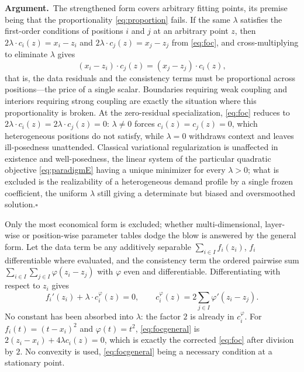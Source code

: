 \documentclass[twoside,11pt]{article}
\newcommand{\argument}{\par\medskip\noindent\textbf{Argument.}\ }
\newcommand{\qedbox}{\hfill$\square$}
\begin{document}
\argument The strengthened form covers arbitrary fitting points, its premise being that the proportionality \eqref{eq:proportion} fails. If the same $\lambda$ satisfies the first-order conditions of positions $i$ and $j$ at an arbitrary point $z$, then $2\lambda \cdot c_i (z) = x_i - z_i$ and $2\lambda \cdot c_j (z) = x_j - z_j$ from \eqref{eq:foc}, and cross-multiplying to eliminate $\lambda$ gives
\begin{equation}
(x_i - z_i) \cdot c_j (z) = (x_j - z_j) \cdot c_i (z),
\label{eq:proportion}%
\end{equation}%
that is, the data residuals and the consistency terms must be proportional across positions---the price of a single scalar. Boundaries requiring weak coupling and interiors requiring strong coupling are exactly the situation where this proportionality is broken. At the zero-residual specialization, \eqref{eq:foc} reduces to $2\lambda \cdot c_i (z) = 2\lambda \cdot c_j (z) = 0$: $\lambda \neq 0$ forces $c_i (z) = c_j (z) = 0$, which heterogeneous positions do not satisfy, while $\lambda = 0$ withdraws context and leaves ill-posedness unattended. Classical variational regularization is unaffected in existence and well-posedness, the linear system of the particular quadratic objective \eqref{eq:paradigmE} having a unique minimizer for every $\lambda > 0$; what is excluded is the realizability of a heterogeneous demand profile by a single frozen coefficient, the uniform $\lambda$ still giving a determinate but biased and oversmoothed solution.\qedbox

Only the most economical form is excluded; whether multi-dimensional, layer-wise or position-wise parameter tables dodge the blow is answered by the general form. Let the data term be any additively separable $\sum_{i \in I} f_i(z_i)$, $f_i$ differentiable where evaluated, and the consistency term the ordered pairwise sum $\sum_{i \in I} \sum_{j \in I} \varphi(z_i - z_j)$ with $\varphi$ even and differentiable. Differentiating with respect to $z_i$ gives
\begin{equation}
f_i'(z_i) + \lambda \cdot c_i^{\varphi}(z) = 0, \qquad c_i^{\varphi}(z) = 2 \sum_{j \in I} \varphi'(z_i - z_j).
\label{eq:focgeneral}%
\end{equation}%
No constant has been absorbed into $\lambda$: the factor $2$ is already in $c_i^{\varphi}$. For $f_i(t) = (t - x_i)^2$ and $\varphi(t) = t^2$, \eqref{eq:focgeneral} is $2(z_i-x_i)+4\lambda c_i(z)=0$, which is exactly the corrected \eqref{eq:foc} after division by $2$. No convexity is used, \eqref{eq:focgeneral} being a necessary condition at a stationary point.
\end{document}

